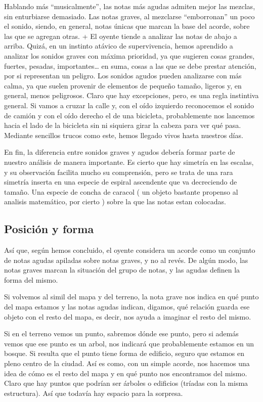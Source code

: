 \documentclass[]{article}
\begin{document}
Hablando más ``musicalmente'', las notas más agudas admiten mejor las mezclas, sin enturbiarse demasiado. Las notas graves, al mezclarse ``emborronan'' un poco el sonido, siendo, en general, notas únicas que marcan la base del acorde, sobre las que se agregan otras. + El oyente tiende a analizar las notas de abajo a arriba. Quizá, en un instinto atávico de supervivencia, hemos aprendido a analizar los sonidos graves con máxima prioridad, ya que sugieren cosas grandes, fuertes, pesadas, importantes\ldots{} en suma, cosas a las que se debe prestar atención, por si representan un peligro. Los sonidos agudos pueden analizarse con más calma, ya que suelen provenir de elementos de pequeño tamaño, ligeros y, en general, menos peligrosos. Claro que hay excepciones, pero, es una regla instintiva general. Si vamos a cruzar la calle y, con el oído izquierdo reconocemos el sonido de camión y con el oído derecho el de una bicicleta, probablemente nos lancemos hacia el lado de la bicicleta sin ni siquiera girar la cabeza para ver qué pasa. Mediante sencillos trucos como este, hemos llegado vivos hasta nuestros días.

En fin, la diferencia entre sonidos graves y agudos debería formar parte de nuestro análisis de manera importante. Es cierto que hay simetría en las escalas, y su observación facilita mucho su comprensión, pero se trata de una rara simetría inserta en una especie de espiral ascendente que va decreciendo de tamaño. Una especie de concha de caracol ( un objeto bastante propenso al analisis matemático, por cierto ) sobre la que las notas estan colocadas.

\subsection{Posición y forma}

Así que, según hemos concluido, el oyente considera un acorde como un conjunto de notas agudas apiladas sobre notas graves, y no al revés. De algún modo, las notas graves marcan la situación del grupo de notas, y las agudas definen la forma del mismo.

Si volvemos al simil del mapa y del terreno, la nota grave nos indica en qué punto del mapa estamos y las notas agudas indican, digamos, qué relación guarda ese objeto con el resto del mapa, es decir, nos ayuda a imaginar el resto del mismo.

Si en el terreno vemos un punto, sabremos dónde ese punto, pero si además vemos que ese punto es un arbol, nos indicará que probablemente estamos en un bosque. Si resulta que el punto tiene forma de edificio, seguro que estamos en pleno centro de la ciudad. Así es como, con un simple acorde, nos hacemos una idea de cómo es el resto del mapa y en qué punto nos encontramos del mismo. Claro que hay puntos que podrían ser árboles o edificios (tríadas con la misma estructura). Así que todavía hay espacio para la sorpresa.
\end{document}
